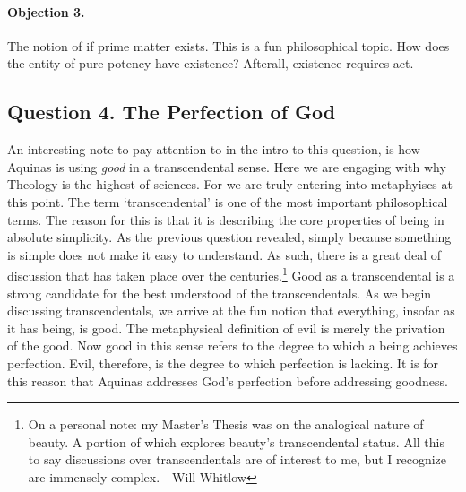 \documentclass{ucetd}
\begin{document}
\paragraph{Objection 3.}
The notion of if prime matter exists. This is a fun philosophical topic. How does the entity of pure potency have existence? Afterall, existence requires act.


\subsection{Question 4. The Perfection of God}
An interesting note to pay attention to in the intro to this question, is how Aquinas is using \textit{good} in a transcendental sense. Here we are engaging with why Theology is the highest of sciences. For we are truly entering into metaphyiscs at this point. The term `transcendental' is one of the most important philosophical terms. The reason for this is that it is describing the core properties of being in absolute simplicity. As the previous question revealed, simply because something is simple does not make it easy to understand. As such, there is a great deal of discussion that has taken place over the centuries.\footnote{On a personal note: my Master's Thesis was on the analogical nature of beauty. A portion of which explores beauty's transcendental status. All this to say discussions over transcendentals are of interest to me, but I recognize are immensely complex. - Will Whitlow} Good as a transcendental is a strong candidate for the best understood of the transcendentals. As we begin discussing transcendentals, we arrive at the fun notion that everything, insofar as it has being, is good. The metaphysical definition of evil is merely the privation of the good. Now good in this sense refers to the degree to which a being achieves perfection. Evil, therefore, is the degree to which perfection is lacking. It is for this reason that Aquinas addresses God's perfection before addressing goodness.
\end{document}
